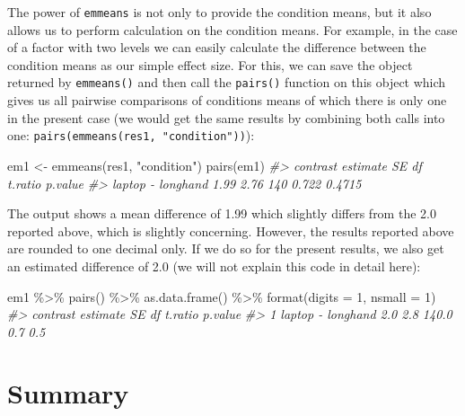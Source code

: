 \documentclass[
]{book}
\newenvironment{Shaded}{\begin{snugshade}}{\end{snugshade}}
\newcommand{\AttributeTok}[1]{\textcolor[rgb]{0.77,0.63,0.00}{#1}}
\newcommand{\CommentTok}[1]{\textcolor[rgb]{0.56,0.35,0.01}{\textit{#1}}}
\newcommand{\DecValTok}[1]{\textcolor[rgb]{0.00,0.00,0.81}{#1}}
\newcommand{\FunctionTok}[1]{\textcolor[rgb]{0.00,0.00,0.00}{#1}}
\newcommand{\NormalTok}[1]{#1}
\newcommand{\OtherTok}[1]{\textcolor[rgb]{0.56,0.35,0.01}{#1}}
\newcommand{\SpecialCharTok}[1]{\textcolor[rgb]{0.00,0.00,0.00}{#1}}
\newcommand{\StringTok}[1]{\textcolor[rgb]{0.31,0.60,0.02}{#1}}
\begin{document}
The power of \texttt{emmeans} is not only to provide the condition means, but it also allows us to perform calculation on the condition means. For example, in the case of a factor with two levels we can easily calculate the difference between the condition means as our simple effect size. For this, we can save the object returned by \texttt{emmeans()} and then call the \texttt{pairs()} function on this object which gives us all pairwise comparisons of conditions means of which there is only one in the present case (we would get the same results by combining both calls into one: \texttt{pairs(emmeans(res1,\ "condition"))}):

\begin{Shaded}
\begin{Highlighting}[]
\NormalTok{em1 }\OtherTok{\textless{}{-}} \FunctionTok{emmeans}\NormalTok{(res1, }\StringTok{"condition"}\NormalTok{)}
\FunctionTok{pairs}\NormalTok{(em1)}
\CommentTok{\#\textgreater{}  contrast          estimate   SE  df t.ratio p.value}
\CommentTok{\#\textgreater{}  laptop {-} longhand     1.99 2.76 140 0.722   0.4715}
\end{Highlighting}
\end{Shaded}

The output shows a mean difference of 1.99 which slightly differs from the 2.0 reported above, which is slightly concerning. However, the results reported above are rounded to one decimal only. If we do so for the present results, we also get an estimated difference of 2.0 (we will not explain this code in detail here):

\begin{Shaded}
\begin{Highlighting}[]
\NormalTok{em1 }\SpecialCharTok{\%\textgreater{}\%} 
  \FunctionTok{pairs}\NormalTok{() }\SpecialCharTok{\%\textgreater{}\%} 
  \FunctionTok{as.data.frame}\NormalTok{() }\SpecialCharTok{\%\textgreater{}\%} 
  \FunctionTok{format}\NormalTok{(}\AttributeTok{digits =} \DecValTok{1}\NormalTok{, }\AttributeTok{nsmall =} \DecValTok{1}\NormalTok{)}
\CommentTok{\#\textgreater{}            contrast estimate  SE    df t.ratio p.value}
\CommentTok{\#\textgreater{} 1 laptop {-} longhand      2.0 2.8 140.0     0.7     0.5}
\end{Highlighting}
\end{Shaded}

\hypertarget{summary}{%
\section{Summary}\label{summary}}
\end{document}
